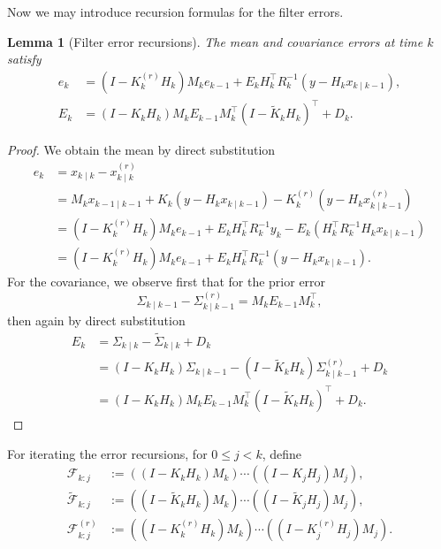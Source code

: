 \documentclass[a4paper,12pt]{article}
\newtheorem{lemma}[theorem]{Lemma}
\begin{document}
Now we may introduce recursion formulas for the filter errors.
\begin{lemma}[Filter error recursions]\label{lem:recursions}
    The mean and covariance errors at time $k$ satisfy
    \begin{align}
        e_k &= (I-K_{k}^{(r)} H_k)M_k e_{k-1} + E_k H_{k}^{\top} R_{k}^{-1} (y-H_k x_{k \mid k-1}),\\
        E_k &= (I-K_k H_k)M_k E_{k-1} M_{k}^{\top}(I-\widetilde{K}_k H_k)^{\top} + D_{k}.
    \end{align}
\end{lemma}
\begin{proof}
We obtain the mean by direct substitution
\begin{align}
    e_k &= x_{k \mid k} - x_{k \mid k}^{(r)}\\
        &= M_k x_{k-1 \mid k-1} + K_k (y-H_k x_{k \mid k-1}) - K_{k}^{(r)} (y - H_k x_{k \mid k-1}^{(r)})\\
        &= (I- K_{k}^{(r)} H_k)M_k e_{k-1} + E_k H_{k}^{\top} R_{k}^{-1} y_k - E_k(H_{k}^{\top} R_{k}^{-1} H_{k} x_{k \mid k-1})\\
        &= (I-K_{k}^{(r)} H_k)M_k e_{k-1} + E_k H_{k}^{\top} R_{k}^{-1} (y-H_k x_{k \mid k-1}).
\end{align}
For the covariance, we observe first that for the prior error
\begin{equation}
    \Sigma_{k\mid k-1} - \Sigma_{k\mid k-1}^{(r)} = M_k E_{k-1} M_{k}^{\top},
\end{equation}
then again by direct substitution
\begin{align}
    E_k &= \Sigma_{k\mid k} - \widetilde{\Sigma}_{k\mid k} + D_{k}\\
        &= (I - K_k H_k) \Sigma_{k\mid k-1} - (I - \widetilde{K}_k H_k) \Sigma_{k\mid k-1}^{(r)} + D_k \\
        &= (I - K_k H_k) M_k E_{k-1} M_{k}^{\top} (I-\widetilde{K}_k H_k)^{\top} + D_k.
\end{align}
\end{proof}
For iterating the error recursions, for $0 \leq j<k$, define
\begin{align}
    \mathcal{F}_{k:j} &:= ((I-K_{k} H_{k})M_k) \cdots ((I-K_{j} H_{j})M_j),\\
    \widetilde{\mathcal{F}}_{k:j} &:= ((I-\widetilde K_{k} H_{k})M_k) \cdots ((I- \widetilde K_{j} H_{j})M_j),\\
    \mathcal{F}_{k:j}^{(r)} &:= ((I-K_{k}^{(r)} H_{k})M_k) \cdots ((I-K_{j}^{(r)} H_{j})M_j). \label{eq:errorpropagators}
\end{align}
\end{document}
